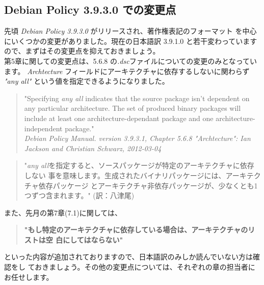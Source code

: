 \documentclass[mingoth,a4paper]{jsarticle}
\begin{document}
\subsection{Debian Policy 3.9.3.0 での変更点}
先頃 {\it Debian Policy 3.9.3.0} がリリースされ、著作権表記のフォーマット
を中心にいくつかの変更がありました。現在の日本語訳 3.9.1.0 と若干変わっています
ので、まずはその変更点を抑えておきましょう。\\
第5章に関しての変更点は、5.6.8 の{\it *.dsc}ファイルについての変更のみとなってい
ます。 {\it Archtecture} フィールドにアーキテクチャに依存するしないに関わらず
{\it "any all"} という値を指定できるようになりました。
\begin{quote}
"Specifying {\it any all} indicates that the source package isn't dependent on any
particular architecture. The set of produced binary packages will include at
least one architecture-dependant package and one architecture-independent
package."\\
{\it Debian Policy Manual. version 3.9.3.1, Chapter 5.6.8 "Archtecture":
Ian Jackson and Christian Schwarz, 2012-03-04}
\end{quote}
\begin{quote}
"{\it any all}を指定すると、ソースパッケージが特定のアーキテクチャに依存しない
事を意味します。生成されたバイナリパッケージには、アーキテクチャ依存パッケージ
とアーキテクチャ非依存パッケージが、少なくとも1つずつ含まれます。" (訳：八津尾)
\end{quote}
また、先月の第7章(7.1)に関しては、
\begin{quote}
{\bf "もし特定のアーキテクチャに依存している場合は、アーキテクチャのリストは空
白にしてはならない"}
\end{quote}
といった内容が追加されておりますので、日本語訳のみしか読んでいない方は確認をし
ておきましょう。その他の変更点については、それぞれの章の担当者にお任せします。
\end{document}

